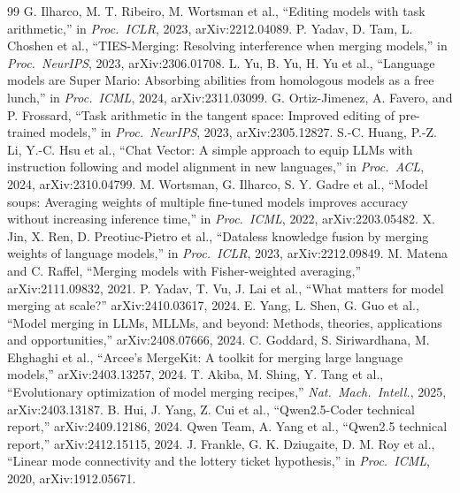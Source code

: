 \documentclass[conference]{IEEEtran}
\begin{document}
\begin{thebibliography}{99}
 G. Ilharco, M. T. Ribeiro, M. Wortsman et al., ``Editing models with task arithmetic,'' in \emph{Proc.\ ICLR}, 2023, arXiv:2212.04089.
 P. Yadav, D. Tam, L. Choshen et al., ``TIES-Merging: Resolving interference when merging models,'' in \emph{Proc.\ NeurIPS}, 2023, arXiv:2306.01708.
 L. Yu, B. Yu, H. Yu et al., ``Language models are Super Mario: Absorbing abilities from homologous models as a free lunch,'' in \emph{Proc.\ ICML}, 2024, arXiv:2311.03099.
 G. Ortiz-Jimenez, A. Favero, and P. Frossard, ``Task arithmetic in the tangent space: Improved editing of pre-trained models,'' in \emph{Proc.\ NeurIPS}, 2023, arXiv:2305.12827.
 S.-C. Huang, P.-Z. Li, Y.-C. Hsu et al., ``Chat Vector: A simple approach to equip LLMs with instruction following and model alignment in new languages,'' in \emph{Proc.\ ACL}, 2024, arXiv:2310.04799.
 M. Wortsman, G. Ilharco, S. Y. Gadre et al., ``Model soups: Averaging weights of multiple fine-tuned models improves accuracy without increasing inference time,'' in \emph{Proc.\ ICML}, 2022, arXiv:2203.05482.
 X. Jin, X. Ren, D. Preotiuc-Pietro et al., ``Dataless knowledge fusion by merging weights of language models,'' in \emph{Proc.\ ICLR}, 2023, arXiv:2212.09849.
 M. Matena and C. Raffel, ``Merging models with Fisher-weighted averaging,'' arXiv:2111.09832, 2021.
 P. Yadav, T. Vu, J. Lai et al., ``What matters for model merging at scale?'' arXiv:2410.03617, 2024.
 E. Yang, L. Shen, G. Guo et al., ``Model merging in LLMs, MLLMs, and beyond: Methods, theories, applications and opportunities,'' arXiv:2408.07666, 2024.
 C. Goddard, S. Siriwardhana, M. Ehghaghi et al., ``Arcee's MergeKit: A toolkit for merging large language models,'' arXiv:2403.13257, 2024.
 T. Akiba, M. Shing, Y. Tang et al., ``Evolutionary optimization of model merging recipes,'' \emph{Nat.\ Mach.\ Intell.}, 2025, arXiv:2403.13187.
 B. Hui, J. Yang, Z. Cui et al., ``Qwen2.5-Coder technical report,'' arXiv:2409.12186, 2024.
 Qwen Team, A. Yang et al., ``Qwen2.5 technical report,'' arXiv:2412.15115, 2024.
 J. Frankle, G. K. Dziugaite, D. M. Roy et al., ``Linear mode connectivity and the lottery ticket hypothesis,'' in \emph{Proc.\ ICML}, 2020, arXiv:1912.05671.

\end{thebibliography}
\end{document}

